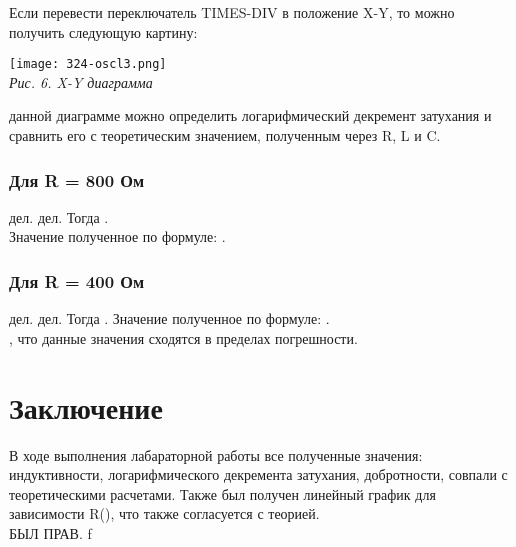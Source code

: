Если перевести переключатель TIMES-DIV в положение X-Y, то можно получить следующую картину:

\begin{center}

    \texttt{[image: 324-oscl3.png]} \\
    \textit{Рис. 6. X-Y диаграмма}

\end{center}

 данной диаграмме можно определить логарифмический декремент затухания и сравнить его с теоретическим значением, полученным через R, L и C.

\newpage

\subsubsection{Для R = 800 Ом}
 дел.  дел. Тогда . \\ [0.2cm]
Значение полученное по формуле: .

\subsubsection{Для R = 400 Ом}
 дел.  дел. Тогда .
Значение полученное по формуле: . \\ [0.2cm]

, что данные значения сходятся в пределах погрешности.

\section{Заключение}

В ходе выполнения лабараторной работы все полученные значения: индуктивности, логарифмического декремента затухания, добротности, совпали с теоретическими расчетами. Также был получен линейный график для зависимости R(\mth{\Theta}), что также согласуется с теорией. \\ [0.3cm]

 БЫЛ ПРАВ. f